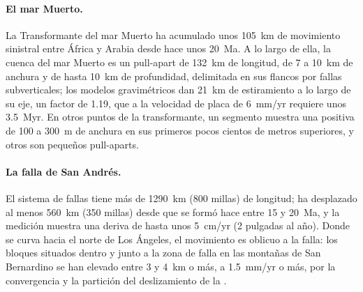 \paragraph{El mar Muerto.} La Transformante del mar Muerto ha acumulado unos
\qty{105}{km} de movimiento sinistral entre África y Arabia desde hace unos
\qty{20}{Ma}. A lo largo de ella, la cuenca del mar Muerto es un pull-apart de
\qty{132}{km} de longitud, de 7 a \qty{10}{km} de anchura y de hasta
\qty{10}{km} de profundidad, delimitada en sus flancos por fallas
subverticales; los modelos gravimétricos dan \qty{21}{km} de estiramiento a
lo largo de su eje, un factor de 1.19, que a la velocidad de placa de
\qty{6}{mm/yr} requiere unos \qty{3.5}{Myr}. En otros puntos de la
transformante, un segmento muestra una  positiva de 100 a \qty{300}{m} de anchura en sus primeros pocos cientos de metros superiores, y otros son pequeños pull-aparts.

\paragraph{La falla de San Andrés.} El sistema de fallas tiene más de
\qty{1290}{km} (800 millas) de longitud; ha desplazado al menos
\qty{560}{km} (350 millas) desde que se formó hace entre 15 y \qty{20}{Ma}, y
la medición muestra una deriva de hasta unos \qty{5}{cm/yr} (2 pulgadas
al año). Donde se curva hacia el norte de Los Ángeles, el movimiento es
oblicuo a la falla: los bloques situados dentro y junto a la zona de falla en
las montañas de San Bernardino se han elevado entre 3 y \qty{4}{km} o más, a
\qty{1.5}{mm/yr} o más, por la convergencia y la partición del deslizamiento de la .

